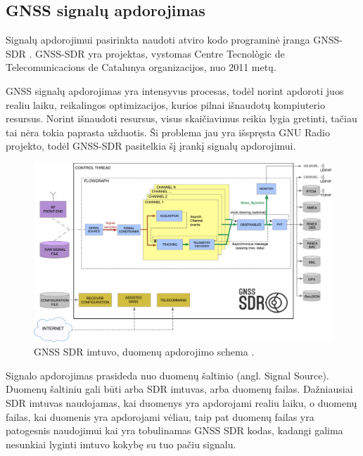 \documentclass[main.tex]{subfiles}
\begin{document}
\subsection{GNSS signalų apdorojimas}

Signalų apdorojimui pasirinkta naudoti atviro kodo programinė įranga
GNSS-SDR \cite{GNSS-SDR11}. GNSS-SDR yra projektas, vystomas
Centre Tecnològic de Telecomunicacions de Catalunya organizacijos,
nuo 2011 metų.

GNSS signalų apdorojimas yra intensyvus procesas,
todėl norint apdoroti juos realiu laiku, reikalingos optimizacijos,
kurios pilnai išnaudotų kompiuterio resursus. Norint išnaudoti resursus,
visus skaičiavimus reikia lygia gretinti, tačiau tai nėra tokia
paprasta užduotis. Ši problema jau yra išspręsta GNU Radio projekto,
todėl GNSS-SDR pasitelkia šį įrankį signalų apdorojimui.

\begin{figure}[h]
    \begin{centering}
    \includegraphics[scale=12.0]{drawings/GeneralBlockDiagram}
    \par\end{centering}
    \protect\caption{\label{fig:gnss_sdr_block}GNSS SDR imtuvo, duomenų apdorojimo schema \cite{gnss_sdr_web}.}
\end{figure}

Signalo apdorojimas prasideda nuo duomenų šaltinio (angl. Signal Source). Duomenų šaltiniu
gali būti arba SDR imtuvas, arba duomenų failas. Dažniausiai SDR imtuvas naudojamas,
kai duomenys yra apdorojami realiu laiku, o duomenų failas, kai duomenis yra apdorojami
vėliau, taip pat duomenų failas yra patogesnis naudojimui kai yra tobulinamas GNSS SDR
kodas, kadangi galima nesunkiai lyginti imtuvo kokybę su tuo pačiu signalu.
\end{document}
